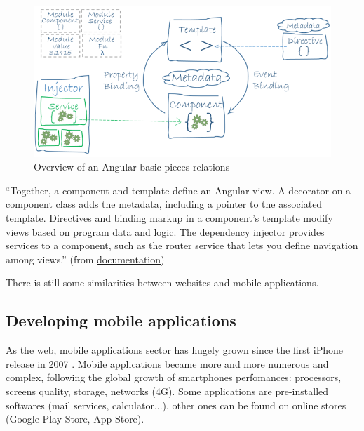 \documentclass{article}
\begin{document}
                        \begin{figure}[H]
                            \centering
                            \includegraphics[width=\textwidth]{overview.png}
                            \caption{Overview of an Angular basic pieces relations}
                        \end{figure}
                        ``Together, a component and template define an Angular view.
                        A decorator on a component class adds the metadata, including a pointer to the associated template.
                        Directives and binding markup in a component's template modify views based on program data and logic.
                        The dependency injector provides services to a component, such as the router service that lets you define navigation among views.''
                        (from \href{https://angular.io/guide/architecture}{documentation})


                        There is still some similarities between websites and mobile applications.

                \subsection{Developing mobile applications}
                    As the web, mobile applications sector has hugely grown \cite{grown} since the first iPhone release in 2007 \cite{iphone}.
                    Mobile applications became more and more numerous and complex, following the global growth of smartphones perfomances:
                    processors, screens quality, storage, networks (4G). Some applications are pre-installed softwares (mail services, calculator...),
                    other ones can be found on online stores (Google Play Store, App Store).
\end{document}
